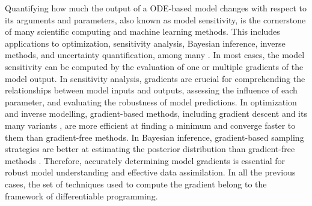 Quantifying how much the output of a ODE-based model changes with respect to its arguments and parameters, also known as model sensitivity, is the cornerstone of many scientific computing and machine learning methods. 
This includes applications to optimization, sensitivity analysis, Bayesian inference, inverse methods, and uncertainty quantification, among many \cite{Razavi.2021}. 
In most cases, the model sensitivity can be computed by the evaluation of one or multiple gradients of the model output. 
In sensitivity analysis, gradients are crucial for comprehending the relationships between model inputs and outputs, assessing the influence of each parameter, and evaluating the robustness of model predictions. 
In optimization and inverse modelling, gradient-based methods, including gradient descent and its many variants \cite{ruder2016overview-gradient-descent}, are more efficient at finding a minimum and converge faster to them than gradient-free methods.
In Bayesian inference, gradient-based sampling strategies are better at estimating the posterior distribution than gradient-free methods \cite{neal2011mcmc}.
Therefore, accurately determining model gradients is essential for robust model understanding and effective data assimilation. 
In all the previous cases, the set of techniques used to compute the gradient belong to the framework of differentiable programming. 

